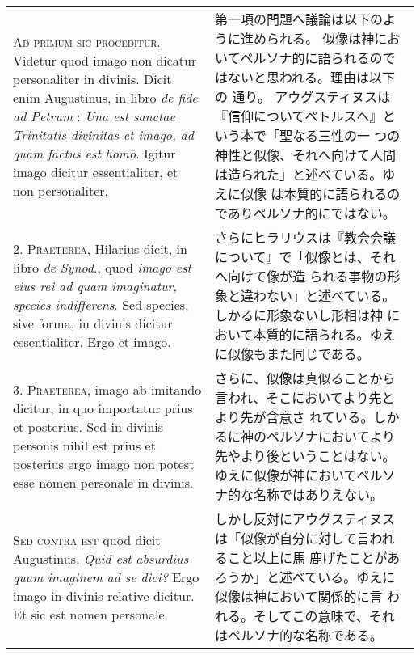 \documentclass[10pt]{jsarticle} %
\begin{document}
\begin{longtable}{p{21em}p{21em}}


{\scshape Ad primum sic proceditur}. Videtur quod imago non dicatur personaliter
in divinis. Dicit enim Augustinus, in libro {\itshape de fide ad
 Petrum} : {\itshape Una est
sanctae Trinitatis divinitas et imago, ad quam factus est homo}. Igitur
imago dicitur essentialiter, et non personaliter.

&

第一項の問題へ議論は以下のように進められる。
似像は神においてペルソナ的に語られるのではないと思われる。理由は以下の
 通り。
アウグスティヌスは『信仰についてペトルスへ』という本で「聖なる三性の一
 つの神性と似像、それへ向けて人間は造られた」と述べている。ゆえに似像
 は本質的に語られるのでありペルソナ的にではない。


\\



2. {\scshape Praeterea}, Hilarius dicit, in libro {\itshape de Synod}., quod {\itshape imago est eius rei
ad quam imaginatur, species indifferens}. Sed species, sive forma, in
divinis dicitur essentialiter. Ergo et imago.

&

さらにヒラリウスは『教会会議について』で「似像とは、それへ向けて像が造
 られる事物の形象と違わない」と述べている。しかるに形象ないし形相は神
 において本質的に語られる。ゆえに似像もまた同じである。

\\



3. {\scshape Praeterea}, imago ab imitando dicitur, in quo importatur prius et
posterius. Sed in divinis personis nihil est prius et posterius ergo
imago non potest esse nomen personale in divinis.

&

さらに、似像は真似ることから言われ、そこにおいてより先とより先が含意さ
 れている。しかるに神のペルソナにおいてより先やより後ということはない。
 ゆえに似像が神においてペルソナ的な名称ではありえない。

\\



{\scshape Sed contra est} quod dicit Augustinus, {\itshape Quid est absurdius quam imaginem
ad se dici?} Ergo imago in divinis relative dicitur. Et sic est nomen
personale.

&

しかし反対にアウグスティヌスは「似像が自分に対して言われること以上に馬
 鹿げたことがあろうか」と述べている。ゆえに似像は神において関係的に言
 われる。そしてこの意味で、それはペルソナ的な名称である。


\end{longtable}
\end{document}
